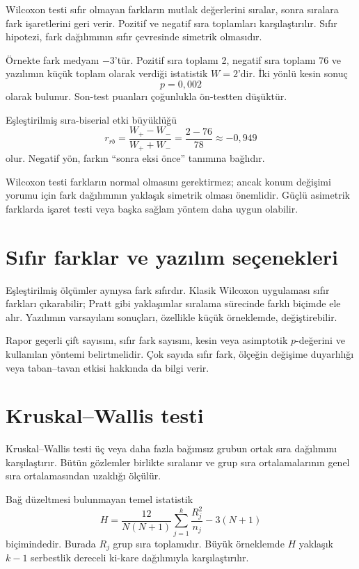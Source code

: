 Wilcoxon testi sıfır olmayan farkların mutlak değerlerini sıralar, sonra
sıralara fark işaretlerini geri verir. Pozitif ve negatif sıra toplamları
karşılaştırılır. Sıfır hipotezi, fark dağılımının sıfır çevresinde simetrik
olmasıdır.

Örnekte fark medyanı $-3$'tür. Pozitif sıra toplamı 2, negatif sıra toplamı
76 ve yazılımın küçük toplam olarak verdiği istatistik $W=2$'dir. İki yönlü
kesin sonuç
\[
p=0{,}002
\]
olarak bulunur. Son-test puanları çoğunlukla ön-testten düşüktür.

Eşleştirilmiş sıra-biserial etki büyüklüğü
\[
r_{rb}=\frac{W_+-W_-}{W_++W_-}
=\frac{2-76}{78}\approx-0{,}949
\]
olur. Negatif yön, farkın ``sonra eksi önce'' tanımına bağlıdır.

\begin{mistakebox}
Wilcoxon testi farkların normal olmasını gerektirmez; ancak konum değişimi
yorumu için fark dağılımının yaklaşık simetrik olması önemlidir. Güçlü
asimetrik farklarda işaret testi veya başka sağlam yöntem daha uygun olabilir.
\end{mistakebox}

\section{Sıfır farklar ve yazılım seçenekleri}

Eşleştirilmiş ölçümler aynıysa fark sıfırdır. Klasik Wilcoxon uygulaması sıfır
farkları çıkarabilir; Pratt gibi yaklaşımlar sıralama sürecinde farklı biçimde
ele alır. Yazılımın varsayılanı sonuçları, özellikle küçük örneklemde,
değiştirebilir.

Rapor geçerli çift sayısını, sıfır fark sayısını, kesin veya asimptotik
$p$-değerini ve kullanılan yöntemi belirtmelidir. Çok sayıda sıfır fark,
ölçeğin değişime duyarlılığı veya taban--tavan etkisi hakkında da bilgi verir.

\section{Kruskal--Wallis testi}

Kruskal--Wallis testi üç veya daha fazla bağımsız grubun ortak sıra
dağılımını karşılaştırır. Bütün gözlemler birlikte sıralanır ve grup sıra
ortalamalarının genel sıra ortalamasından uzaklığı ölçülür.

Bağ düzeltmesi bulunmayan temel istatistik
\[
H=\frac{12}{N(N+1)}
\sum_{j=1}^k\frac{R_j^2}{n_j}-3(N+1)
\]
biçimindedir. Burada $R_j$ grup sıra toplamıdır. Büyük örneklemde $H$ yaklaşık
$k-1$ serbestlik dereceli ki-kare dağılımıyla karşılaştırılır.

